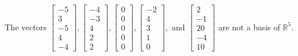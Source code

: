 \begin{exercise}
\begin{exerciseStatement}
  \end{exerciseStatement}
  \begin{exerciseAnswer}
   The vectors \(\left[\begin{array}{r}
-5 \\
3 \\
-5 \\
4 \\
-4
\end{array}\right] , \left[\begin{array}{r}
-4 \\
-3 \\
4 \\
2 \\
2
\end{array}\right] , \left[\begin{array}{r}
0 \\
0 \\
0 \\
0 \\
0
\end{array}\right] , \left[\begin{array}{r}
-2 \\
4 \\
3 \\
1 \\
0
\end{array}\right] , \text{ and } \left[\begin{array}{r}
2 \\
-1 \\
20 \\
-4 \\
10
\end{array}\right]\) 
  	 are not  a basis of \(\mathbb{R}^5\).
  


  \end{exerciseAnswer}
\end{exercise}
